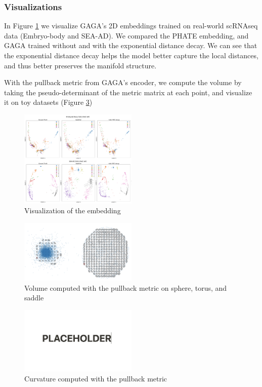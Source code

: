 \documentclass{article}
\theoremstyle{plain}
\theoremstyle{definition}
\theoremstyle{remark}
\newcommand{\methodshort}{GAGA\xspace}
\begin{document}
\subsubsection{Visualizations}
\par In Figure \ref{fig:embedding} we visualize \methodshort's 2D embeddings trained on real-world scRNAseq data (Embryo-body\cite{moon2019visualizing} and SEA-AD\cite{gabitto2023integrated}). We compared the PHATE embedding, and \methodshort trained without and with the exponential distance decay. We can see that the exponential distance decay helps the model better capture the local distances, and thus better preserves the manifold structure.
\par With the pullback metric from \methodshort's encoder, we compute the volume by taking the pseudo-determinant of the metric matrix at each point, and visualize it on toy datasets (Figure \ref{fig:volume})
\begin{figure}[htbp]
    \centering
    \includegraphics[width=0.5\textwidth]{fig/visualization.png}
    \caption{Visualization of the embedding}
    \label{fig:embedding}
\end{figure}
\begin{figure}[htbp]
    \centering
    \includegraphics[width=0.5\textwidth]{fig/volume.png}
    \caption{Volume computed with the pullback metric on sphere, torus, and saddle}
    \label{fig:volume}
\end{figure}
\begin{figure}[htbp]
    \centering
    \includegraphics[width=0.5\textwidth]{fig/PLACEHOLDER.png}
    \caption{Curvature computed with the pullback metric}
    \label{fig:volume}
\end{figure}
\end{document}
